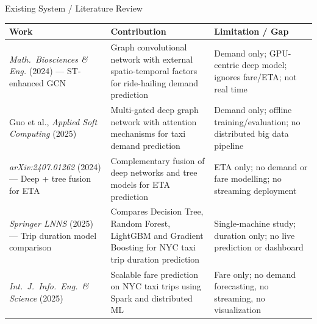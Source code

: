 \documentclass[aspectratio=169]{beamer}
\begin{document}
\begin{frame}{Existing System / Literature Review}
  \scriptsize
  \begin{tabular}{p{} p{} p{}}
    \toprule
    \textbf{Work} & \textbf{Contribution} & \textbf{Limitation / Gap} \\
    \midrule
    \emph{Math.\ Biosciences \& Eng.} (2024) --- ST-enhanced GCN &
    Graph convolutional network with external spatio-temporal factors for
    ride-hailing demand prediction &
    Demand only; GPU-centric deep model; ignores fare/ETA; not real time \\
    \addlinespace
    Guo et al., \emph{Applied Soft Computing} (2025) &
    Multi-gated deep graph network with attention mechanisms for taxi
    demand prediction &
    Demand only; offline training/evaluation; no distributed big data pipeline \\
    \addlinespace
    \emph{arXiv:2407.01262} (2024) --- Deep + tree fusion for ETA &
    Complementary fusion of deep networks and tree models for ETA
    prediction &
    ETA only; no demand or fare modelling; no streaming deployment \\
    \addlinespace
    \emph{Springer LNNS} (2025) --- Trip duration model comparison &
    Compares Decision Tree, Random Forest, LightGBM and Gradient Boosting for
    NYC taxi trip duration prediction &
    Single-machine study; duration only; no live prediction or dashboard \\
    \addlinespace
    \emph{Int.\ J.\ Info.\ Eng.\ \& Science} (2025) &
    Scalable fare prediction on NYC taxi trips using Spark and distributed ML &
    Fare only; no demand forecasting, no streaming, no visualization \\
    \bottomrule
  \end{tabular}
\end{frame}
\end{document}
